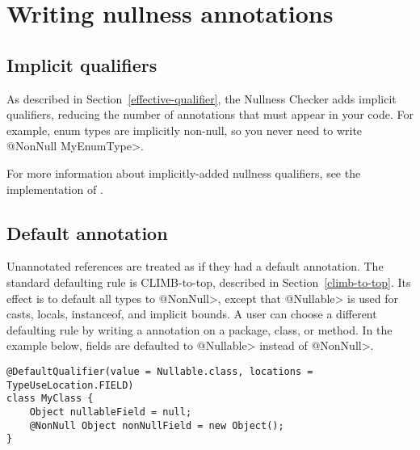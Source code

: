 \section{Writing nullness annotations\label{writing-nullness-annotations}}

\subsection{Implicit qualifiers\label{nullness-implicit-qualifiers}}

As described in Section~\ref{effective-qualifier}, the Nullness Checker
adds implicit qualifiers, reducing the number of annotations that must
appear in your code.
For example, enum types are implicitly non-null, so you never need to write
\<@NonNull MyEnumType>.

For more information about implicitly-added nullness qualifiers, see the
implementation of .



\subsection{Default annotation\label{null-defaults}}

Unannotated references are treated as if they had a default annotation.
The standard defaulting rule is CLIMB-to-top,  described in
Section~\ref{climb-to-top}.  Its effect is to default all types to
\<@NonNull>, except that \<@Nullable> is used for casts, locals,
instanceof, and implicit bounds.  A user can choose a different defaulting
rule by writing a  annotation on a
 package, class, or method.  In the example below, fields are defaulted to
\<@Nullable> instead of \<@NonNull>.

\begin{Verbatim}
@DefaultQualifier(value = Nullable.class, locations = TypeUseLocation.FIELD)
class MyClass {
    Object nullableField = null;
    @NonNull Object nonNullField = new Object();
}
\end{Verbatim}


